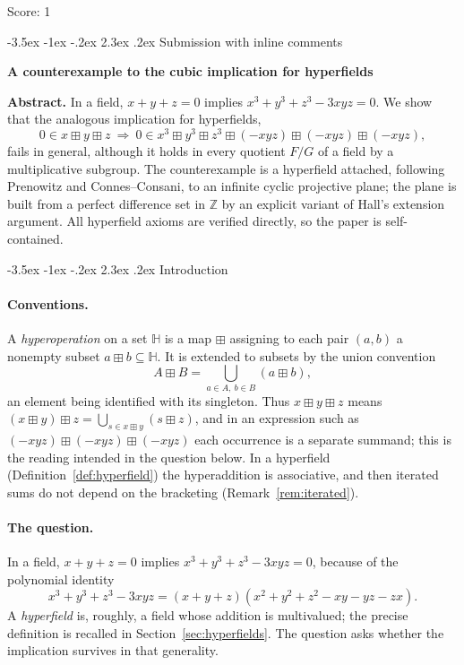 \documentclass[11pt]{article}
\makeatletter
\renewcommand\section{\@startsection{section}{1}{\z@}
  {-3.5ex \@plus -1ex \@minus -.2ex}
  {2.3ex \@plus.2ex}
  {\normalfont\bfseries}}
\theoremstyle{plain}
\theoremstyle{definition}
\newcommand{\Z}{\mathbb{Z}}
\newcommand{\Hh}{\mathbb{H}}
\newcommand{\bp}{\boxplus}
\makeatother
\begin{document}
\noindent Score: 1


\newpage
\section{Submission with inline comments}


\begin{center}
{\textbf{A counterexample to the cubic implication for hyperfields}}
\end{center}

\medskip
\noindent\textbf{Abstract.}
In a field, $x+y+z=0$ implies $x^3+y^3+z^3-3xyz=0$.  We show that the
analogous implication for hyperfields,
\[
 0\in x\bp y\bp z
 \ \Longrightarrow\
 0\in x^3\bp y^3\bp z^3\bp(-xyz)\bp(-xyz)\bp(-xyz),
\]
fails in general, although it holds in every quotient $F/G$ of a field
by a multiplicative subgroup.  The counterexample is a hyperfield
attached, following Prenowitz and Connes--Consani, to an infinite
cyclic projective plane; the plane is built from a perfect difference
set in $\Z$ by an explicit variant of Hall's extension argument.  All
hyperfield axioms are verified directly, so the paper is
self-contained.

\section{Introduction}\label{sec:intro}

\paragraph{Conventions.}
A \emph{hyperoperation} on a set $\Hh$ is a map $\bp$ assigning to each
pair $(a,b)$ a nonempty subset $a\bp b\subseteq\Hh$.  It is extended to
subsets by the union convention
\begin{equation}\label{eq:union}
 A\bp B=\bigcup_{a\in A,\ b\in B}(a\bp b),
\end{equation}
an element being identified with its singleton.  Thus
$x\bp y\bp z$ means $(x\bp y)\bp z=\bigcup_{s\in x\bp y}(s\bp z)$, and
in an expression such as $(-xyz)\bp(-xyz)\bp(-xyz)$ each occurrence is a
separate summand; this is the reading intended in the question below.
In a hyperfield (Definition~\ref{def:hyperfield}) the hyperaddition is
associative, and then iterated sums do not depend on the bracketing
(Remark~\ref{rem:iterated}).

\paragraph{The question.}
In a field, $x+y+z=0$ implies $x^3+y^3+z^3-3xyz=0$, because of the
polynomial identity
\begin{equation}\label{eq:cubic}
 x^3+y^3+z^3-3xyz=(x+y+z)(x^2+y^2+z^2-xy-yz-zx).
\end{equation}
A \emph{hyperfield} is, roughly, a field whose addition is multivalued;
the precise definition is recalled in Section~\ref{sec:hyperfields}.
The question asks whether the implication survives in that generality.
\end{document}
